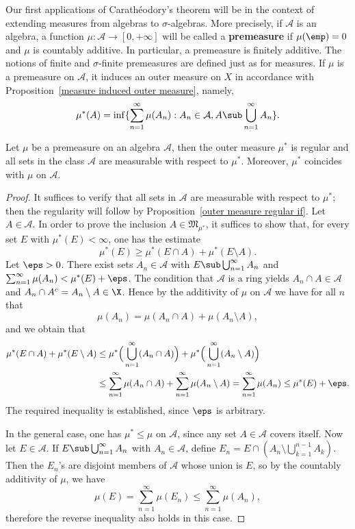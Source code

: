 Our first applications of Carath\'eodory's theorem will be in the context of extending measures from algebras to $\sigma$-algebras. More precisely, if $\mathcal{A}$ is an algebra, a function $\mu:\mathcal{A}\to[0,+\infty]$ will be called a \textbf{premeasure} if $\mu(\emp)=0$ and $\mu$ is countably additive. In particular, a premeasure is finitely additive. The notions of finite and $\sigma$-finite premeasures are defined just as for measures. If $\mu$ is a premeasure on $\mathcal{A}$, it induces an outer measure on $X$ in accordance with Proposition~\ref{measure induced outer measure}, namely,
\[\mu^*(A)=\inf\{\sum_{n=1}^{\infty}\mu(A_n):A_n\in\mathcal{A}, A\sub\bigcup_{n=1}^{\infty}A_n\}.\]
\begin{theorem}\label{measure additive on ring generate regular}
Let $\mu$ be a premeasure on an algebra $\mathcal{A}$, then the outer measure $\mu^*$ is regular and all sets in the class $\mathcal{A}$ are measurable with respect to $\mu^*$. Moreover, $\mu^*$ coincides with $\mu$ on $\mathcal{A}$.
\end{theorem}
\begin{proof}
It suffices to verify that all sets in $\mathcal{A}$ are measurable with respect to $\mu^*$; then the regularity will follow by Proposition~\ref{outer measure regular if}. Let $A\in\mathcal{A}$. In order to prove the inclusion $A\in\mathfrak{M}_{\mu^*}$, it suffices to show that, for every set $E$ with $\mu^*(E)<\infty$, one has the estimate
\[\mu^*(E)\geq\mu^*(E\cap A)+\mu^*(E\setminus A).\]
Let $\eps>0$. There exist sets $A_n\in\mathcal{A}$ with $E\sub\bigcup_{n=1}^{\infty}A_n$ and $\sum_{n=1}^{\infty}\mu(A_n)<\mu^*(E)+\eps$. The condition that $\mathcal{A}$ is a ring yields $A_n\cap A\in\mathcal{A}$ and $A_n\cap A^c=A_n\setminus A\in\X$. Hence by the additivity of $\mu$ on $\mathcal{A}$ we have for all $n$ that
\[\mu(A_n)=\mu(A_n\cap A)+\mu(A_n\setminus A),\]
and we obtain that
\begin{align*}
\mu^*(E\cap A)+\mu^*(E\setminus A)&\leq\mu^*\Big(\bigcup_{n=1}^{\infty}(A_n\cap A)\Big)+\mu^*\Big(\bigcup_{n=1}^{\infty}(A_n\setminus A)\Big)\\
&\leq\sum_{n=1}^{\infty}\mu(A_n\cap A)+\sum_{n=1}^{\infty}\mu(A_n\setminus A)=\sum_{n=1}^{\infty}\mu(A_n)\leq\mu^*(E)+\eps.
\end{align*}
The required inequality is established, since $\eps$ is arbitrary.\par
In the general case, one has $\mu^*\leq\mu$ on $\mathcal{A}$, since any set $A\in\mathcal{A}$ covers itself. Now let $E\in\mathcal{A}$. If $E\sub\bigcup_{n=1}^{\infty}A_n$ with $A_n\in\mathcal{A}$, define $E_n=E\cap(A_n\setminus\bigcup_{k=1}^{n-1}A_k)$. Then the $E_n$'s are disjoint members of $\mathcal{A}$ whose union is $E$, so by the countably additivity of $\mu$, we have
\[\mu(E)=\sum_{n=1}^{\infty}\mu(E_n)\leq\sum_{n=1}^{\infty}\mu(A_n),\]
therefore the reverse inequality also holds in this case.
\end{proof}
